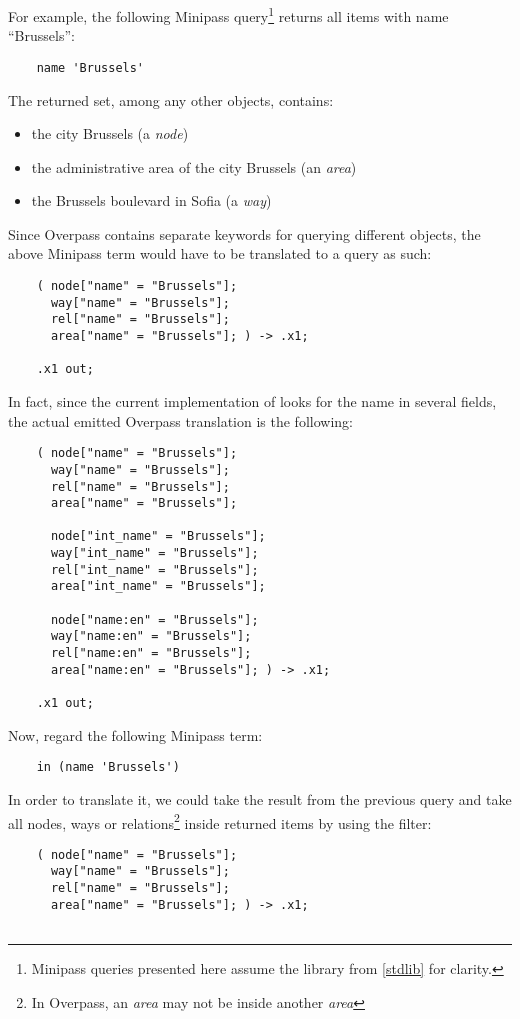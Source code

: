 \documentclass[main.tex]{subfiles}
\begin{document}
\begin{example}
For example, the following Minipass
query\footnote{
    Minipass queries presented here assume the library from \cref{stdlib}
    for clarity.
} returns all items with name ``Brussels'':
\begin{lstwrap}\begin{lstlisting}
    name 'Brussels'
\end{lstlisting}\end{lstwrap}
The returned set, among any other objects, contains:
\begin{itemize}
    \item the city Brussels (a \emph{node})
    \item the administrative area of the city Brussels (an \emph{area})
    \item the Brussels boulevard in Sofia (a \emph{way})
\end{itemize}
Since Overpass contains separate keywords for querying different objects,
the above Minipass term would have to be translated to a query as such:
\begin{lstwrap}\begin{lstlisting}
    ( node["name" = "Brussels"];
      way["name" = "Brussels"];
      rel["name" = "Brussels"];
      area["name" = "Brussels"]; ) -> .x1;

    .x1 out;
\end{lstlisting}\end{lstwrap}
In fact, since the current implementation of  looks for the
name in several fields, the actual emitted Overpass translation is the
following:
\begin{lstwrap}\begin{lstlisting}
    ( node["name" = "Brussels"];
      way["name" = "Brussels"];
      rel["name" = "Brussels"];
      area["name" = "Brussels"];

      node["int_name" = "Brussels"];
      way["int_name" = "Brussels"];
      rel["int_name" = "Brussels"];
      area["int_name" = "Brussels"];

      node["name:en" = "Brussels"];
      way["name:en" = "Brussels"];
      rel["name:en" = "Brussels"];
      area["name:en" = "Brussels"]; ) -> .x1;

    .x1 out;
\end{lstlisting}\end{lstwrap}

Now, regard the following Minipass term:
\begin{lstwrap}\begin{lstlisting}
    in (name 'Brussels')
\end{lstlisting}\end{lstwrap}
In order to translate it, we could take the result from the previous query
and take all nodes, ways or relations\footnote{In Overpass, an \emph{area} may
    not be inside another \emph{area}} inside returned items by using the
 filter:
\begin{lstwrap}\begin{lstlisting}
    ( node["name" = "Brussels"];
      way["name" = "Brussels"];
      rel["name" = "Brussels"];
      area["name" = "Brussels"]; ) -> .x1;


\end{lstlisting}
\end{lstwrap}
\end{example}
\end{document}
